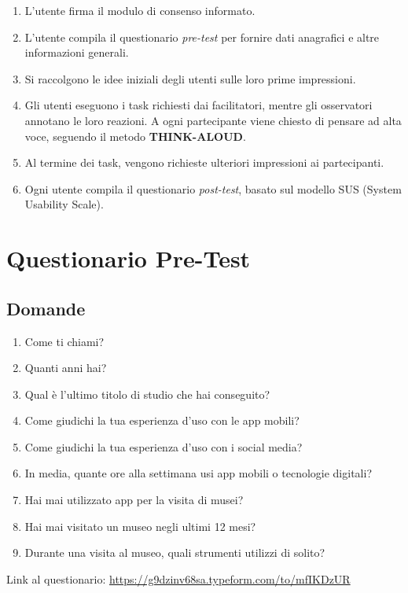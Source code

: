 \documentclass{article}
\begin{document}
\begin{enumerate}
    \item L'utente firma il modulo di consenso informato.
    \item L'utente compila il questionario \textit{pre-test} per fornire dati anagrafici e altre informazioni generali.
    \item Si raccolgono le idee iniziali degli utenti sulle loro prime impressioni.
    \item Gli utenti eseguono i task richiesti dai facilitatori, mentre gli osservatori annotano le loro reazioni. A ogni partecipante viene chiesto di pensare ad alta voce, seguendo il metodo \textbf{THINK-ALOUD}.
    \item Al termine dei task, vengono richieste ulteriori impressioni ai partecipanti.
    \item Ogni utente compila il questionario \textit{post-test}, basato sul modello SUS (System Usability Scale).
\end{enumerate}

\section{Questionario Pre-Test}
\subsection*{Domande}
\begin{enumerate}
    \item Come ti chiami?
    \item Quanti anni hai?
    \item Qual \`e l'ultimo titolo di studio che hai conseguito?
    \item Come giudichi la tua esperienza d’uso con le app mobili?
    \item Come giudichi la tua esperienza d'uso con i social media?
    \item In media, quante ore alla settimana usi app mobili o tecnologie digitali?
    \item Hai mai utilizzato app per la visita di musei?
    \item Hai mai visitato un museo negli ultimi 12 mesi?
    \item Durante una visita al museo, quali strumenti utilizzi di solito?
\end{enumerate}

\noindent Link al questionario: \url{https://g9dzinv68sa.typeform.com/to/mfIKDzUR}
\end{document}
